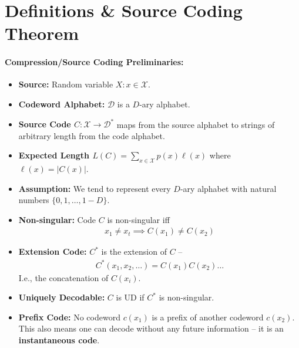 \documentclass[a4paper,12pt]{report}
\begin{document}
\section{Definitions \& Source Coding Theorem}

\paragraph{Compression/Source Coding Preliminaries: } 
\begin{itemize}
\item \textbf{Source:} Random variable $X: x\in \mathcal X$.
\item \textbf{Codeword Alphabet:} $\mathcal D$ is a $D$-ary alphabet.
\item \textbf{Source Code $C: \mathcal X \to \mathcal D^*$ } maps from the
source alphabet to strings of arbitrary length from the code alphabet. 
\item \textbf{Expected Length $L(C) = \sum_{x\in \mathcal X} p(x)\ell(x)$} where
$\ell(x) = |C(x)|$.
\item \textbf{Assumption: } We tend to represent every $D$-ary alphabet with
natural numbers $\{0,1,\dots, 1-D\}$.
\item \textbf{Non-singular: } Code $C$ is non-singular iff \begin{align}
	\label{eqn:non_sing}
	x_1 \neq x_t \implies C(x_1) \neq C(x_2)
\end{align}
\item \textbf{Extension Code: } $C^*$ is the extension of $C$ -- \begin{align}
C^*(x_1, x_2, \dots) = C(x_1)C(x_2)\dots
\end{align}
I.e., the concatenation of $C(x_i)$.
\item \textbf{Uniquely Decodable: } $C$ is UD if $C^*$ is non-singular.
\item \textbf{Prefix Code: } No codeword $c(x_1)$ is a prefix of another
codeword $c(x_2)$. This also means one can decode without any future information
-- it is an \textbf{instantaneous code}.
\end{itemize}
\end{document}
